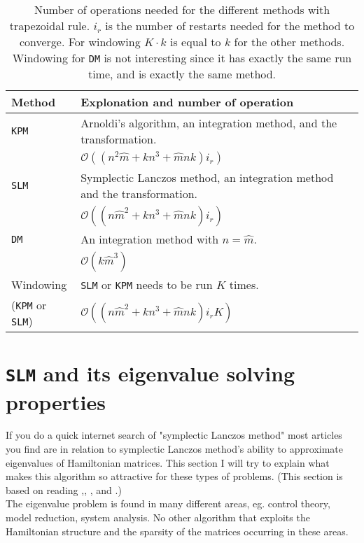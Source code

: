 \begin{table}
\begin{tabular}{l | l}
Method & Explonation and number of operation \\
\hline
\texttt{KPM} & Arnoldi's algorithm, an integration method, and the transformation.
\\ & $ \mathcal{O}((n^2 \hat{m} + k n^3 + \hat{m}nk)i_r)$ \\ 
\texttt{SLM} & Symplectic Lanczos method, an integration method and the transformation. 
\\ & $ \mathcal{O}((n \hat{m}^2 + k n^3 + \hat{m}nk)i_r) $  \\
\texttt{DM} & An integration method with $n = \hat{m}$. 
\\  & $\mathcal{O}(k\hat{m}^3)$ \\
Windowing  & \texttt{SLM} or \texttt{KPM} needs to be run $K$ times. \\ (\texttt{KPM} or \texttt{SLM}) & $\mathcal{O}((n \hat{m}^2 + k n^3 + \hat{m}nk)i_r K)$ \\
\end{tabular}
\label{tab:cc}
\caption{ Number of operations needed for the different methods with trapezoidal rule. $i_r$ is the number of restarts needed for the method to converge. For windowing $K\cdot k$ is equal to $k$ for the other methods. Windowing for \texttt{DM} is not interesting since it has exactly the same run time, and is exactly the same method. }
\end{table}

\section{\texttt{SLM} and its eigenvalue solving properties} %
If you do a quick internet search of "symplectic Lanczos method" most articles you find are in relation to symplectic Lanczos method's ability to approximate eigenvalues of Hamiltonian matrices. This section I will try to explain what makes this algorithm so attractive for these types of problems. (This section is based on reading \cite{SLM1},\cite{SLM2}, \cite{SLM3}, and \cite{SLM4}.) \\

The eigenvalue problem is found in many different areas, eg. control theory, model reduction, system analysis. No other algorithm that exploits the Hamiltonian structure and the sparsity of the matrices occurring in these areas. \\

